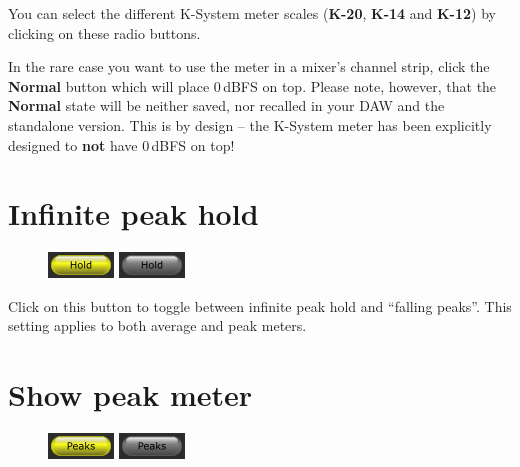 You can select the different K-System meter scales (\textbf{K-20}, \textbf{K-14} and
\textbf{K-12}) by clicking on these radio buttons.

In the rare case you want to use the meter in a mixer's channel strip,
click the \textbf{Normal} button which will place 0\,dBFS on top.
Please note, however, that the \textbf{Normal} state will be neither
saved, nor recalled in your DAW and the standalone version.  This is
by design -- the K-System meter has been explicitly designed to
\textbf{not} have 0\,dBFS on top!

\section{Infinite peak hold}

\begin{figure}
  \includegraphics[scale=\screenshotscale,clip]{include/images/button_peak_hold_on.png}
  \newline \vspace{-0.9\baselineskip}
  \includegraphics[scale=\screenshotscale,clip]{include/images/button_peak_hold_off.png}
\end{figure}

Click on this button to toggle between infinite peak hold and
``falling peaks''.  This setting applies to both average and peak
meters.

\section{Show peak meter}

\begin{figure}
  \includegraphics[scale=\screenshotscale,clip]{include/images/button_peak_meter_on.png}
  \newline \vspace{-0.9\baselineskip}
  \includegraphics[scale=\screenshotscale,clip]{include/images/button_peak_meter_off.png}
\end{figure}

